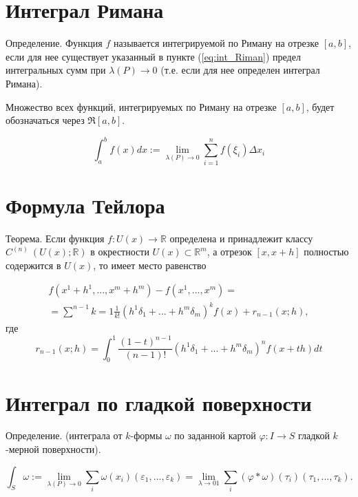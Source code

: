 \documentclass[a4paper, 12pt]{extarticle} %
\begin{document}
\clearpage

\section*{Интеграл Римана}

Определение. Функция $f$ называется интегрируемой по Риману на отрезке $[a, b]$, если для нее существует указанный в пункте (\ref{eq:int_Riman}) предел интегральных сумм при $\lambda (P) \to 0$ (т.е. если для нее определен интеграл Римана).

Множество всех функций, интегрируемых по Риману на отрезке $[a, b]$, будет обозначаться через $\Re [a, b]$.

\[
    \int^b_a f(x) dx := \lim_{\lambda(P) \to 0} \sum^n_{i = 1} f(\xi_i) \Delta x_i
    \label{eq:int_Riman}
\]

\clearpage

\section*{Формула Тейлора}

Теорема. Если функция $f: U(x) \to \mathbb{R}$ определена и принадлежит классу $C^{(n)} \ (U(x); \mathbb{R})$ в окрестности $U(x) \subset \mathbb{R}^m$, а отрезок $[x, x + h]$ полностью содержится в $U(x)$, то имеет место равенство

\begin{eqnarray*}
    f(x^1 + h^1, ..., x^m+h^m) - f(x^1, ...,x^m) = \\ = \sum^{n - 1}{k = 1} \frac{1}{k!} (h^1 \delta_1 + ... + h^m \delta_m)^k f(x) + r_{n - 1}(x; h),
\end{eqnarray*}
где
\begin{equation}
    r_{n-1}(x;h) = \int^1_0 \frac{(1-t)^{n - 1}}{(n - 1)!} (h^1 \delta_1 + ... + h^m \delta_m)^n f(x + th) dt
\end{equation}

\clearpage
\section*{Интеграл по гладкой поверхности}
Определение. (интеграла от $k$-формы $\omega$ по заданной картой $\varphi: I \to S$ гладкой $k$-мерной поверхности).

\[
    \int_S \omega := \lim_{\lambda (P) \to 0} \sum_i \omega (x_i)(\varepsilon_1, ..., \varepsilon_k) = \lim_{\lambda \to 01} \sum_i (\varphi * \omega)(\tau_i)(\tau_1, ..., \tau_k).
    \label{eq:int_by_smooth_surface_one}
\]
\end{document}
